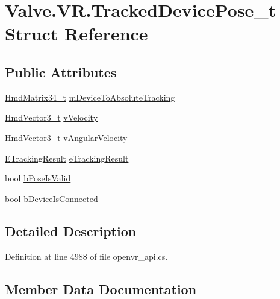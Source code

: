 \hypertarget{struct_valve_1_1_v_r_1_1_tracked_device_pose__t}{}\section{Valve.\+V\+R.\+Tracked\+Device\+Pose\+\_\+t Struct Reference}
\label{struct_valve_1_1_v_r_1_1_tracked_device_pose__t}
\subsection*{Public Attributes}
\begin{DoxyCompactItemize}
\item 
\mbox{\hyperlink{struct_valve_1_1_v_r_1_1_hmd_matrix34__t}{Hmd\+Matrix34\+\_\+t}} \mbox{\hyperlink{struct_valve_1_1_v_r_1_1_tracked_device_pose__t_a5508777d938e49d47c51f8d98c7bdf1f}{m\+Device\+To\+Absolute\+Tracking}}
\item 
\mbox{\hyperlink{struct_valve_1_1_v_r_1_1_hmd_vector3__t}{Hmd\+Vector3\+\_\+t}} \mbox{\hyperlink{struct_valve_1_1_v_r_1_1_tracked_device_pose__t_a1f9f0309ec2f75a9aac22c3e912b99f7}{v\+Velocity}}
\item 
\mbox{\hyperlink{struct_valve_1_1_v_r_1_1_hmd_vector3__t}{Hmd\+Vector3\+\_\+t}} \mbox{\hyperlink{struct_valve_1_1_v_r_1_1_tracked_device_pose__t_af0c599e13ad2c8cd9cbcf3d1bc142e53}{v\+Angular\+Velocity}}
\item 
\mbox{\hyperlink{namespace_valve_1_1_v_r_abe6feab98f33191b7c27b4292012e90a}{E\+Tracking\+Result}} \mbox{\hyperlink{struct_valve_1_1_v_r_1_1_tracked_device_pose__t_ae4acf328076bae4fac39f64582f53ad0}{e\+Tracking\+Result}}
\item 
bool \mbox{\hyperlink{struct_valve_1_1_v_r_1_1_tracked_device_pose__t_a369a8189315516667d0c1cd457b04a81}{b\+Pose\+Is\+Valid}}
\item 
bool \mbox{\hyperlink{struct_valve_1_1_v_r_1_1_tracked_device_pose__t_a402f7b228adab0e097beb14b1edc8f71}{b\+Device\+Is\+Connected}}
\end{DoxyCompactItemize}


\subsection{Detailed Description}


Definition at line 4988 of file openvr\+\_\+api.\+cs.



\subsection{Member Data Documentation}
\mbox{\label{struct_valve_1_1_v_r_1_1_tracked_device_pose__t_a402f7b228adab0e097beb14b1edc8f71}} 
